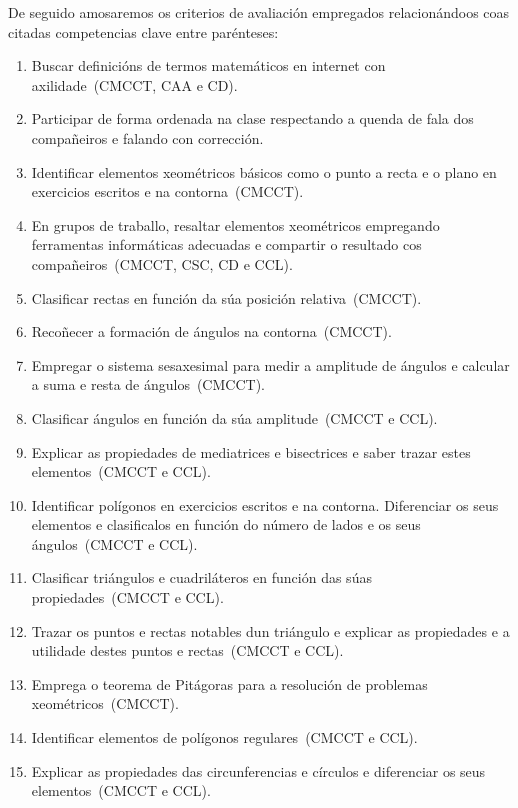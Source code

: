 De seguido amosaremos os criterios de avaliación empregados relacionándoos coas citadas competencias clave entre parénteses:

\begin{enumerate}[label=\bfseries Cri\arabic*, align=left, leftmargin=1.5cm]
  \item\label{cri:definicions} Buscar definicións de termos matemáticos en internet con axilidade~(CMCCT, CAA e CD).
  \item\label{cri:interviraula} Participar de forma ordenada na clase respectando a quenda de fala dos compañeiros e falando con corrección.
  \item\label{cri:puntorecta} Identificar elementos xeométricos básicos como o punto a recta e o plano en exercicios escritos e na contorna~(CMCCT).
  \item\label{cri:resaltar} En grupos de traballo, resaltar elementos xeométricos empregando ferramentas informáticas adecuadas e compartir o resultado cos compañeiros~(CMCCT, CSC, CD e CCL).
  \item\label{cri:posrectas} Clasificar rectas en función da súa posición relativa~(CMCCT).
  \item\label{cri:angulos} Recoñecer a formación de ángulos na contorna~(CMCCT).
  \item\label{cri:sexasesimal} Empregar o sistema sesaxesimal para medir a amplitude de ángulos e calcular a suma e resta de ángulos~(CMCCT).
  \item\label{cri:clasangulos} Clasificar ángulos en función da súa amplitude~(CMCCT e CCL).
  \item\label{cri:mediatriz} Explicar as propiedades de mediatrices e bisectrices e saber trazar estes elementos~(CMCCT e CCL).
  \item\label{cri:poligonos} Identificar polígonos en exercicios escritos e na contorna. Diferenciar os seus elementos e clasificalos en función do número de lados e os seus ángulos~(CMCCT e CCL).
  \item\label{cri:claspoligonos} Clasificar triángulos e cuadriláteros en función das súas propiedades~(CMCCT e CCL).
  \item\label{cri:puntosnotables} Trazar os puntos e rectas notables dun triángulo e explicar as propiedades e a utilidade destes puntos e rectas~(CMCCT e CCL).
  \item\label{cri:pitagoras} Emprega o teorema de Pitágoras para a resolución de problemas xeométricos~(CMCCT).
  \item\label{cri:elementosregulares} Identificar elementos de polígonos regulares~(CMCCT e CCL).
  \item\label{cri:circunferencia} Explicar as propiedades das circunferencias e círculos e diferenciar os seus elementos~(CMCCT e CCL).
\end{enumerate}

